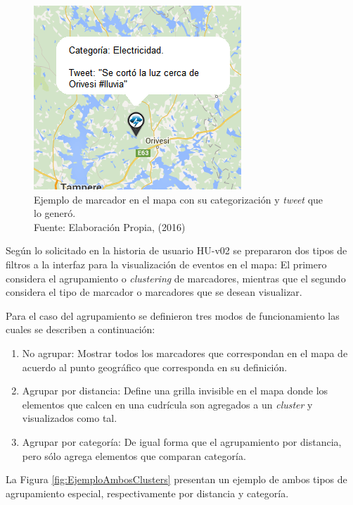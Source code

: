 \begin{figure}[H]
	\centering
	\captionsetup{justification=centering}
	\includegraphics[scale=0.8]{images/EjemploMarker.png}
	\caption[Ejemplo de marcador en el mapa con su categorización y \textit{tweet} que lo generó.]{Ejemplo de marcador en el mapa con su categorización y \textit{tweet} que lo generó.\\Fuente: Elaboración Propia, (2016)}
	\label{fig:EjemploMarker}
\end{figure}

Según lo solicitado en la historia de usuario HU-v02 se prepararon dos tipos de filtros a la interfaz para la visualización de eventos en el mapa: El primero considera el agrupamiento o \textit{clustering} de marcadores, mientras que el segundo considera el tipo de marcador o marcadores que se desean visualizar.

Para el caso del agrupamiento se definieron tres modos de funcionamiento las cuales se describen a continuación:

\begin{enumerate}
\item No agrupar: Mostrar todos los marcadores que correspondan en el mapa de acuerdo al punto geográfico que corresponda en su definición.
\item Agrupar por distancia: Define una grilla invisible en el mapa donde los elementos que calcen en una cudrícula son agregados a un \textit{cluster} y visualizados como tal.
\item Agrupar por categoría: De igual forma que el agrupamiento por distancia, pero sólo agrega elementos que comparan categoría.
\end{enumerate}

La Figura \ref{fig:EjemploAmbosClusters} presentan un ejemplo de ambos tipos de agrupamiento especial, respectivamente por distancia y categoría.

